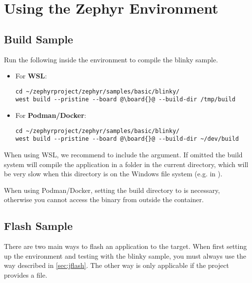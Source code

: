 \section{Using the Zephyr Environment}

\subsection{Build Sample}

Run the following inside the environment to compile the blinky sample.

\begin{itemize}
  \item For \textbf{WSL}:
  \begin{lstlisting}
cd ~/zephyrproject/zephyr/samples/basic/blinky/
west build --pristine --board @\board{}@ --build-dir /tmp/build
\end{lstlisting}
  \item For \textbf{Podman/Docker}:
  \begin{lstlisting}
cd ~/zephyrproject/zephyr/samples/basic/blinky/
west build --pristine --board @\board{}@ --build-dir ~/dev/build
\end{lstlisting}
\end{itemize}

\begin{infobox}
  When using WSL, we recommend to include the  argument.
  If omitted the build system will compile the application in a  folder in the current directory, which will be very slow when this directory is on the Windows file system (e.g. in ).
\end{infobox}

\begin{infobox}
  When using Podman/Docker, setting the build directory to  is necessary, otherwise you cannot access the binary from outside the container.
\end{infobox}


\newpage

\subsection{Flash Sample}

There are two main ways to flash an application to the target.
When first setting up the environment and testing with the blinky sample, you must always use the way described in \autoref{sec:jflash}.
The other way is only applicable if the project provides a  file.

